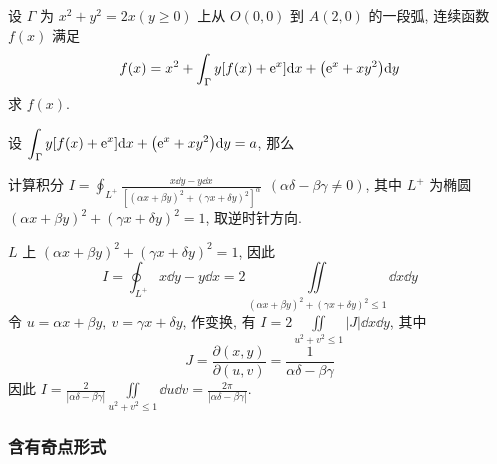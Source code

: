 \begin{example}
    设 $\Gamma $ 为 $x^2+y^2=2x(y\geqslant 0)$ 上从 $O(0,0)$ 到 $A(2,0)$ 的一段弧, 连续函数 $f(x)$ 满足
    $$f(x)=x^2+\int_\Gamma y[f(x)+\mathrm{e}^x]\dd x+\qty(\mathrm{e}^x+xy^2)\dd y$$
    求 $f(x).$
\end{example}
\begin{solution}
    设 $\displaystyle \int_\Gamma y[f(x)+\mathrm{e}^x]\dd x+\qty(\mathrm{e}^x+xy^2)\dd y=a$, 那么
\end{solution}

\begin{example}
    计算积分 $\displaystyle I=\oint_{L^+}\frac{x\dd y-y\dd x}{[(\alpha x+\beta y)^2+(\gamma x+\delta y)^2]^\alpha}~~(\alpha\delta-\beta\gamma\not=0)$, 其中 $L^+$ 为椭圆 $(\alpha x+\beta y)^2+(\gamma x+\delta y)^2=1$, 取逆时针方向.
\end{example}
\begin{solution}
    $L$ 上 $(\alpha x+\beta y)^2+(\gamma x+\delta y)^2=1$, 因此
    $$\displaystyle I=\oint_{L^+}x\dd y-y\dd x=2\iint\limits_{(\alpha x+\beta y)^2+(\gamma x+\delta y)^2\leqslant  1}\dd x\dd y$$
    令 $u=\alpha x+\beta y,~v=\gamma x+\delta y$, 作变换, 有 $\displaystyle I=2\iint\limits_{u^2+v^2\leqslant  1}|J|\dd x\dd y$, 其中
    $$J=\frac{\partial (x,y)}{\partial (u,v)}=\frac{1}{\alpha\delta-\beta\gamma}$$
    因此 $\displaystyle I=\frac{2}{|\alpha\delta-\beta\gamma|}\iint\limits_{u^2+v^2\leqslant  1}\dd u\dd v=\frac{2\pi}{|\alpha\delta-\beta\gamma|}.$
\end{solution}

\subsubsection{含有奇点形式}

